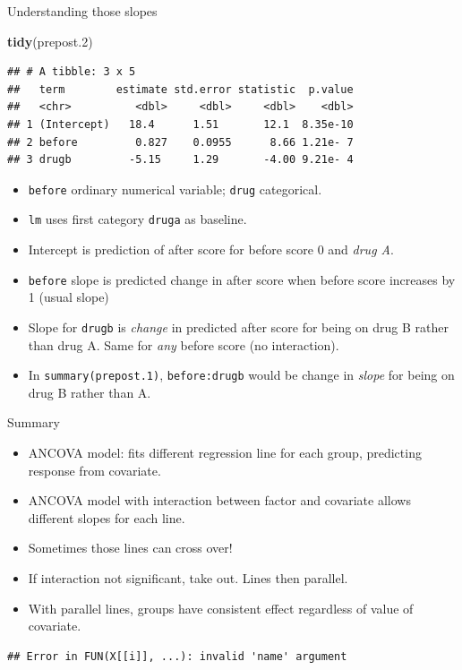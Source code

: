 \documentclass[ignorenonframetext,]{beamer}
\newenvironment{Shaded}{\begin{snugshade}}{\end{snugshade}}
\newcommand{\FloatTok}[1]{\textcolor[rgb]{0.00,0.00,0.81}{#1}}
\newcommand{\KeywordTok}[1]{\textcolor[rgb]{0.13,0.29,0.53}{\textbf{#1}}}
\newcommand{\NormalTok}[1]{#1}
\begin{document}
\begin{frame}[fragile]{Understanding those slopes}
\protect\hypertarget{understanding-those-slopes}{}

\begin{Shaded}
\begin{Highlighting}[]
\KeywordTok{tidy}\NormalTok{(prepost}\FloatTok{.2}\NormalTok{)}
\end{Highlighting}
\end{Shaded}

\begin{verbatim}
## # A tibble: 3 x 5
##   term        estimate std.error statistic  p.value
##   <chr>          <dbl>     <dbl>     <dbl>    <dbl>
## 1 (Intercept)   18.4      1.51       12.1  8.35e-10
## 2 before         0.827    0.0955      8.66 1.21e- 7
## 3 drugb         -5.15     1.29       -4.00 9.21e- 4
\end{verbatim}

\begin{itemize}
\item
  \texttt{before} ordinary numerical variable; \texttt{drug}
  categorical.
\item
  \texttt{lm} uses first category \texttt{druga} as baseline.
\item
  Intercept is prediction of after score for before score 0 and
  \emph{drug A}.
\item
  \texttt{before} slope is predicted change in after score when before
  score increases by 1 (usual slope)
\item
  Slope for \texttt{drugb} is \emph{change} in predicted after score for
  being on drug B rather than drug A. Same for \emph{any} before score
  (no interaction).
\item
  In \texttt{summary(prepost.1)}, \texttt{before:drugb} would be change
  in \emph{slope} for being on drug B rather than A.
\end{itemize}

\end{frame}

\begin{frame}[fragile]{Summary}
\protect\hypertarget{summary}{}

\begin{itemize}
\item
  ANCOVA model: fits different regression line for each group,
  predicting response from covariate.
\item
  ANCOVA model with interaction between factor and covariate allows
  different slopes for each line.
\item
  Sometimes those lines can cross over!
\item
  If interaction not significant, take out. Lines then parallel.
\item
  With parallel lines, groups have consistent effect regardless of value
  of covariate.
\end{itemize}

\begin{verbatim}
## Error in FUN(X[[i]], ...): invalid 'name' argument
\end{verbatim}

\end{frame}
\end{document}
